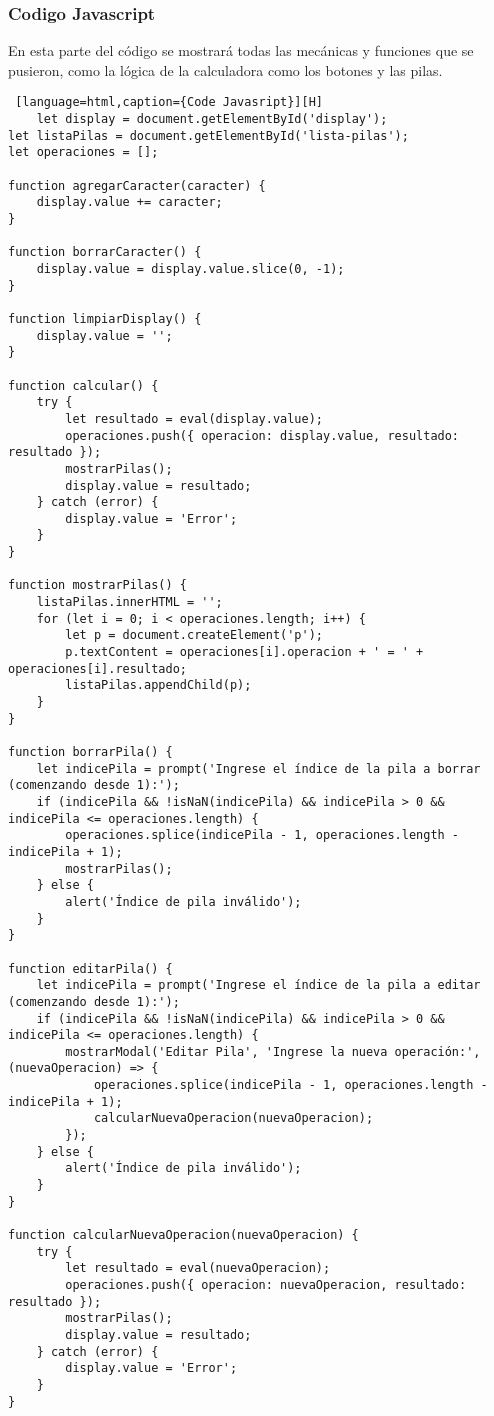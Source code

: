 \documentclass[14pt]{article}
\begin{document}
    \subsubsection{Codigo Javascript}
    En esta parte del código se mostrará todas las mecánicas y funciones que se pusieron, como la lógica de la calculadora como los botones y las pilas.
    \begin{lstlisting} [language=html,caption={Code Javasript}][H]
    let display = document.getElementById('display');
let listaPilas = document.getElementById('lista-pilas');
let operaciones = [];

function agregarCaracter(caracter) {
    display.value += caracter;
}

function borrarCaracter() {
    display.value = display.value.slice(0, -1);
}

function limpiarDisplay() {
    display.value = '';
}

function calcular() {
    try {
        let resultado = eval(display.value);
        operaciones.push({ operacion: display.value, resultado: resultado });
        mostrarPilas();
        display.value = resultado;
    } catch (error) {
        display.value = 'Error';
    }
}

function mostrarPilas() {
    listaPilas.innerHTML = '';
    for (let i = 0; i < operaciones.length; i++) {
        let p = document.createElement('p');
        p.textContent = operaciones[i].operacion + ' = ' + operaciones[i].resultado;
        listaPilas.appendChild(p);
    }
}

function borrarPila() {
    let indicePila = prompt('Ingrese el índice de la pila a borrar (comenzando desde 1):');
    if (indicePila && !isNaN(indicePila) && indicePila > 0 && indicePila <= operaciones.length) {
        operaciones.splice(indicePila - 1, operaciones.length - indicePila + 1);
        mostrarPilas();
    } else {
        alert('Índice de pila inválido');
    }
}

function editarPila() {
    let indicePila = prompt('Ingrese el índice de la pila a editar (comenzando desde 1):');
    if (indicePila && !isNaN(indicePila) && indicePila > 0 && indicePila <= operaciones.length) {
        mostrarModal('Editar Pila', 'Ingrese la nueva operación:', (nuevaOperacion) => {
            operaciones.splice(indicePila - 1, operaciones.length - indicePila + 1);
            calcularNuevaOperacion(nuevaOperacion);
        });
    } else {
        alert('Índice de pila inválido');
    }
}

function calcularNuevaOperacion(nuevaOperacion) {
    try {
        let resultado = eval(nuevaOperacion);
        operaciones.push({ operacion: nuevaOperacion, resultado: resultado });
        mostrarPilas();
        display.value = resultado;
    } catch (error) {
        display.value = 'Error';
    }
}


\end{lstlisting}
\end{document}
